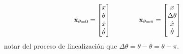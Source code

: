 \documentclass[11pt, a4paper, twoside, openright, openany]{book}
\begin{document}
\[
\mathbf{x}_{\theta=0} = \begin{bmatrix}
x \\ \theta \\ \dot{x} \\ \dot{\theta}
\end{bmatrix} \qquad \qquad 
\mathbf{x}_{\theta=\pi} = \begin{bmatrix}
x \\ \Delta \theta \\ \dot{x} \\ \dot{\theta}
\end{bmatrix}
\]
notar del proceso de linealización que $\Delta \theta = \theta - \bar{\theta} = \theta - \pi$.






\end{document}
